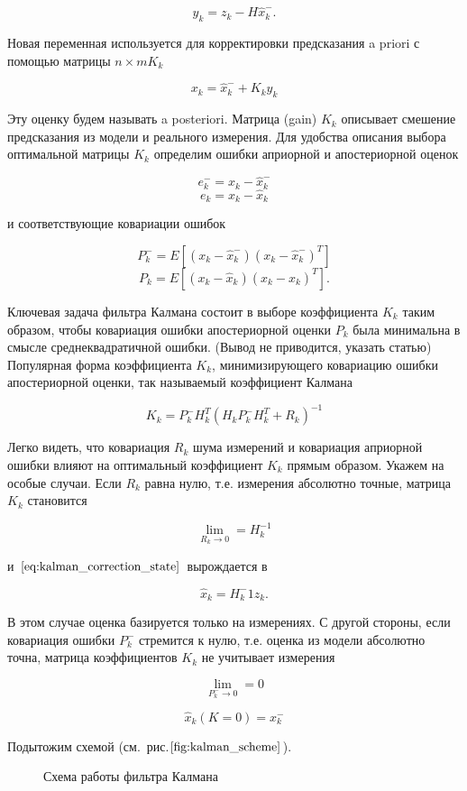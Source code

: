 \documentclass[a4paper]{article}
\begin{document}
$$ y_k = z_k - H\hat{x}_k^- . $$

Новая переменная используется для корректировки предсказания a priori с помощью матрицы $n \times m K_k$

\begin{equation}
	\label{eq:kalman_correction_state}
	x_k = \hat{x}_k^- + K_k y_k
\end{equation}

Эту оценку будем называть a posteriori. Матрица (gain) $K_k$ описывает смешение предсказания из модели и реального измерения. Для удобства описания выбора оптимальной матрицы $K_k$ определим ошибки априорной и апостериорной оценок

$$ e_k^- = x_k - \hat{x}_k^- $$
$$ e_k = x_k - \hat{x}_k $$

и соответствующие ковариации ошибок

$$ P_k^- = E[(x_k - \hat{x}_k^-)(x_k - \hat{x}_k^-)^T] $$
$$ P_k = E[(x_k - \hat{x}_k)(x_k - \hat{x}_k)^T] . $$

Ключевая задача фильтра Калмана состоит в выборе коэффициента $K_k$ таким образом, чтобы ковариация ошибки апостериорной оценки $P_k$ была минимальна в смысле среднеквадратичной ошибки. (Вывод не приводится, указать статью) Популярная форма коэффициента $K_k$, минимизирующего ковариацию ошибки апостериорной оценки, так называемый коэффициент Калмана

$$ K_k = P_k^-  H_k^T (H_k P_k^- H_k^T + R_k)^{-1}$$

Легко видеть, что ковариация $R_k$ шума измерений и ковариация априорной ошибки влияют на оптимальный коэффициент $K_k$ прямым образом. Укажем на особые случаи. Если $R_k$ равна нулю, т.е. измерения абсолютно точные, матрица $K_k$ становится

$$ \lim\limits_{R_k\to0} = H_k^{-1} $$

и $\eqref{eq:kalman_correction_state}$ вырождается в 

$$ \hat x_k = H_k^-1 z_k. $$

В этом случае оценка базируется только на измерениях. С другой стороны, если ковариация ошибки $P_k^-$ стремится к нулю, т.е. оценка из модели абсолютно точна, матрица коэффициентов $K_k$ не учитывает измерения

$$ \lim\limits_{P_k^-\to0} = 0 $$

$$ \hat x_k(K = 0) = x_k^- $$

Подытожим схемой (см.~рис.$\ref{fig:kalman_scheme}$).

\begin{figure}
	\caption{Схема работы фильтра Калмана}
	\label{fig:kalman_scheme}
\end{figure}
\end{document}
